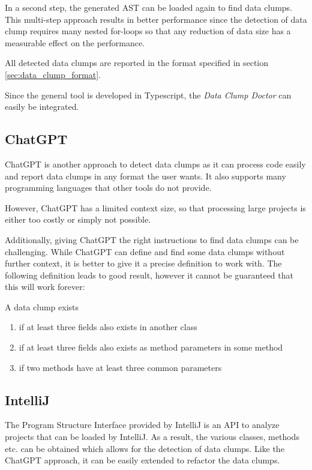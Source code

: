 In a second step, the generated \ac{AST} can be loaded again to find data clumps. This multi-step approach results in better performance since the detection of data clump requires many nested for-loops so that any reduction of data size has a measurable effect on the performance.

All detected data clumps are reported in the format specified in section \ref{sec:data_clump_format}.

Since the general tool is developed in Typescript, the \textit{Data Clump Doctor} can easily be integrated.

\subsection{ChatGPT}
ChatGPT is another approach to detect data clumps as it can process code easily and report data clumps in any format the user wants. It also supports many programming languages that other tools do not provide.

However, ChatGPT has a limited context size, so that processing large projects is  either too costly or simply not possible.

Additionally, giving ChatGPT the right instructions to find data clumps can be challenging. While ChatGPT can define and find some data clumps without further context, it is better to give it a precise definition to work with. The following definition leads to good result, however it cannot be guaranteed that this will work forever:


A data clump exists
\begin{enumerate}
   
   \item if at least three fields also exists in another class
   \item if at least three fields also exists as method parameters in some method
    \item if two methods have at least three common parameters
\end{enumerate}


\subsection{IntelliJ}
The Program Structure Interface provided by IntelliJ is an \ac{API} to analyze projects that can be loaded by IntelliJ. As a result, the various classes, methods etc. can be obtained which allows for the detection of data clumps. Like the ChatGPT approach, it can be easily extended to refactor the data clumps.

